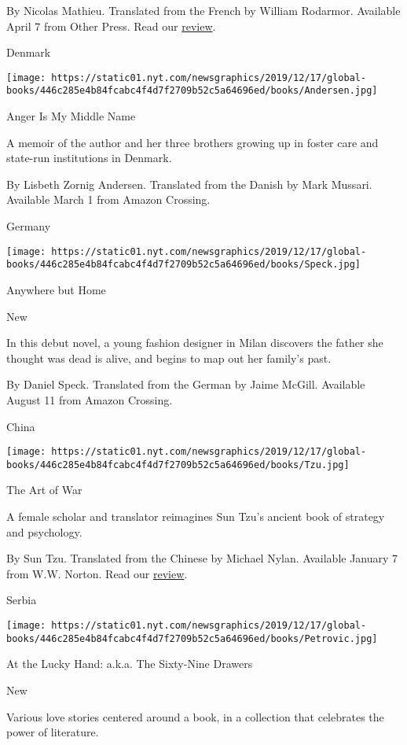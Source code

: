  By Nicolas Mathieu. Translated from the French by William Rodarmor.
Available April 7 from Other Press. Read our
\href{https://www.nytimes.com/2020/04/07/books/review/nicolas-mathieu-their-children-after-them.html}{review}.

Denmark

\texttt{[image: https://static01.nyt.com/newsgraphics/2019/12/17/global-books/446c285e4b84fcabc4f4d7f2709b52c5a64696ed/books/Andersen.jpg]}

Anger Is My Middle Name

A memoir of the author and her three brothers growing up in foster care
and state-run institutions in Denmark.

 By Lisbeth Zornig Andersen. Translated from the Danish by Mark Mussari.
Available March 1 from Amazon Crossing.

Germany

\texttt{[image: https://static01.nyt.com/newsgraphics/2019/12/17/global-books/446c285e4b84fcabc4f4d7f2709b52c5a64696ed/books/Speck.jpg]}

Anywhere but Home

New

In this debut novel, a young fashion designer in Milan discovers the
father she thought was dead is alive, and begins to map out her family's
past.

 By Daniel Speck. Translated from the German by Jaime McGill. Available
August 11 from Amazon Crossing.

China

\texttt{[image: https://static01.nyt.com/newsgraphics/2019/12/17/global-books/446c285e4b84fcabc4f4d7f2709b52c5a64696ed/books/Tzu.jpg]}

The Art of War

A female scholar and translator reimagines Sun Tzu's ancient book of
strategy and psychology.

 By Sun Tzu. Translated from the Chinese by Michael Nylan. Available
January 7 from W.W. Norton. Read our
\href{https://www.nytimes.com/2019/12/23/books/review-art-of-war-sun-tzu-new-translation-michael-nylan.html}{review}.

Serbia

\texttt{[image: https://static01.nyt.com/newsgraphics/2019/12/17/global-books/446c285e4b84fcabc4f4d7f2709b52c5a64696ed/books/Petrovic.jpg]}

At the Lucky Hand: a.k.a. The Sixty-Nine Drawers

New

Various love stories centered around a book, in a collection that
celebrates the power of literature.

